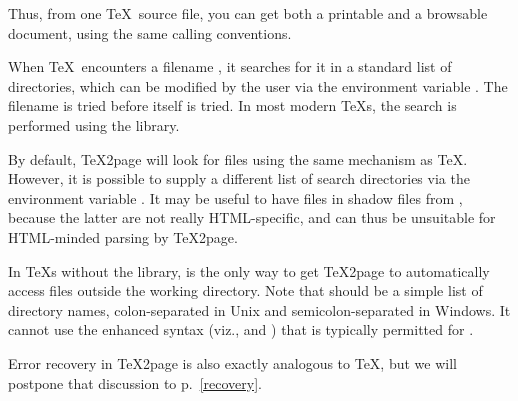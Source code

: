 Thus, from one \TeX\ source file, you can get both a printable  and a
browsable  document, using the same calling
conventions.\iffalse ifx\inpltdist\undefined\f{Quite a few documents profit from
being available additionally as plain text, either as a man page, or as
tagged text on a general-purpose text editor, instead of requiring an HTML
browser.  The scripts \p{t2p2man},
\p{t2p2txt}, and \p{t2p2info}, included in the \TeX2page distribution,
help accomplish this.
Each of these scripts takes as argument the main HTML
file \p{|meta[jobname].html} created by \TeX2page, and generate the
corresponding man page \p{|meta[jobname].1},
the Vim help file \p{|meta[jobname].txt}, and the
Info file
\p{|meta[jobname].info}
respectively.  While the man page is always a single page, the Info and
Vim-help output is composed of multiple files if the HTML document contains
pagebreaks.}\fi



When \TeX\ encounters a filename , it
searches for it
in a standard list of
directories, which can be modified by the user via the
environment variable .
The filename  is tried before
 itself is tried.  In most modern TeXs, the
search is performed using the  library.

By default, \TeX2page will look for files using the same 
mechanism as \TeX.  However, it is possible to supply a
different list of search directories via the environment
variable .
It may be useful to have
files in  shadow files from
, because the latter are not really
HTML-specific, and can thus be unsuitable for
HTML-minded parsing by \TeX2page.

In \TeX s without the  library,
 is the only way to get \TeX2page to
automatically access files outside the working
directory.  Note that  should be a
simple list of directory names, colon-separated in Unix
and semicolon-separated in Windows.  It cannot use the
enhanced syntax (viz., \p{*} and \p{//}) that is
typically permitted for .

%
Error recovery in \TeX2page is also exactly analogous to
\TeX, but we will postpone that discussion to
p.~\ref{recovery}.

